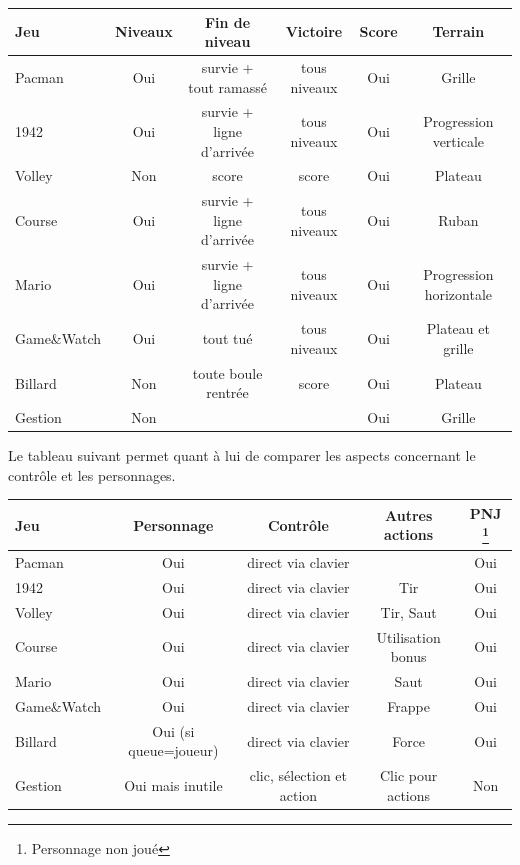 \vspace{0.5cm}
\noindent
\begin{tabular}{|l|| c|c|c|c|c|}
\hline
 Jeu &  Niveaux & Fin de niveau & Victoire & Score & Terrain \\
\hline
 Pacman & Oui & survie + tout ramassé & tous niveaux & Oui & Grille \\
\hline
 1942 & Oui & survie + ligne d'arrivée & tous niveaux & Oui & Progression verticale \\
\hline
 Volley &  Non & score & score & Oui & Plateau \\
\hline
 Course & Oui & survie + ligne d'arrivée & tous niveaux & Oui & Ruban \\
\hline
 Mario & Oui & survie + ligne d'arrivée & tous niveaux & Oui & Progression horizontale\\
\hline
 Game\&Watch & Oui & tout tué & tous niveaux & Oui  & Plateau et grille\\
\hline
 Billard & Non & toute boule rentrée & score & Oui & Plateau \\
\hline
 Gestion & Non & & & Oui & Grille\\
\hline
\end{tabular}

\vspace{0.5cm}

Le tableau suivant permet quant à lui de comparer les aspects concernant le contrôle et les personnages.

\vspace{0.5cm}
\noindent
\begin{tabular}{|l|| c|c|c|c|}
\hline
 Jeu & Personnage & Contrôle & Autres actions & PNJ \footnote{Personnage non joué} \\
\hline
 Pacman &  Oui & direct via clavier & &  Oui \\
\hline
 1942 & Oui & direct via clavier & Tir & Oui  \\
\hline
 Volley & Oui & direct via clavier  & Tir, Saut & Oui \\
\hline
 Course & Oui & direct via clavier & Utilisation bonus & Oui \\
\hline
 Mario & Oui & direct via clavier &  Saut & Oui \\
\hline
 Game\&Watch & Oui & direct via clavier & Frappe & Oui  \\
\hline 
 Billard &  Oui {\small (si queue=joueur)} & direct via clavier & Force & Oui  \\
\hline
 Gestion &  Oui mais inutile & clic, sélection et action & Clic pour actions & Non \\
\hline
\end{tabular}

